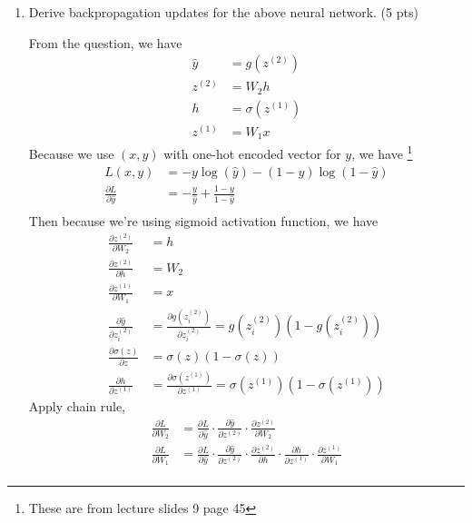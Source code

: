 \documentclass[a4paper]{article}
\theoremstyle{definition}
\newenvironment{soln}{
    \leavevmode\color{blue}\ignorespaces
}{}
\begin{document}
\begin{enumerate}
	\pagebreak
	\item Derive backpropagation updates for the above neural network. (5 pts)

	      \begin{soln}
		      From the question, we have
		      \begin{align*}
			      \hat{y} & = g(z^{(2)})      \\
			      z^{(2)} & = W_2h            \\
			      h       & = \sigma(z^{(1)}) \\
			      z^{(1)} & = W_1x
		      \end{align*}
		      Because we use $(x, y)$ with one-hot encoded vector for $y$, we have \footnote{These are from lecture slides 9 page 45}
		      \begin{align*}
			      L(x, y)                             & = -y\log(\hat{y}) - (1-y)\log(1-\hat{y})     \\
			      \frac{\partial L}{\partial \hat{y}} & = -\frac{y}{\hat{y}} + \frac{1-y}{1-\hat{y}} \\
		      \end{align*}
		      Then because we're using sigmoid activation function, we have
		      \begin{align*}
			      \frac{\partial z^{(2)}}{\partial W_2}      & = h                                                                                      \\
			      \frac{\partial z^{(2)}}{\partial h}        & = W_2                                                                                    \\
			      \frac{\partial z^{(1)}}{\partial W_1}      & = x                                                                                      \\
			      \frac{\partial \hat y}{\partial z_i^{(2)}} & =\frac{\partial g(z_i^{(2)})}{\partial z_i^{(2)}}  = g(z_i^{(2)})(1-g(z_i^{(2)}))        \\
			      \frac{\partial \sigma(z)}{\partial z}      & = \sigma(z)(1-\sigma(z))                                                                 \\
			      \frac{\partial h}{\partial z^{(1)}}        & = \frac{\partial \sigma(z^{(1)})}{\partial z^{(1)}} = \sigma(z^{(1)})(1-\sigma(z^{(1)}))
		      \end{align*}
		      Apply chain rule,
		      \begin{align*}
			      \frac{\partial L}{\partial W_2} & = \frac{\partial L}{\partial \hat{y}} \cdot \frac{\partial \hat{y}}{\partial z^{(2)}} \cdot \frac{\partial z^{(2)}}{\partial W_2}                                                                                     \\
			      \frac{\partial L}{\partial W_1} & = \frac{\partial L}{\partial \hat{y}} \cdot \frac{\partial \hat{y}}{\partial z^{(2)}} \cdot \frac{\partial z^{(2)}}{\partial h} \cdot \frac{\partial h}{\partial z^{(1)}} \cdot \frac{\partial z^{(1)}}{\partial W_1} \\
		      \end{align*}
	      \end{soln}


\end{enumerate}
\end{document}
